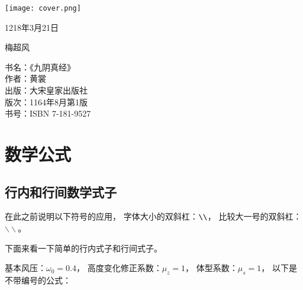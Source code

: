 \documentclass[b5paper,UTF8]{book}
\begin{document}

\thispagestyle{empty}

\begin{center}
\vspace*{3 cm}

\texttt{[image: cover.png]}
\vspace*{1 cm}

\vspace*{1 cm}

\Large {1218年3月21日}
\vspace*{0.5cm}

梅超风
\end{center}
\vspace*{4cm}

\clearpage

\newpage
\thispagestyle{empty}

\noindent
书名：《九阴真经》\\
作者：黄裳\\
出版：大宋皇家出版社\\
版次：1164年8月第1版\\
书号：ISBN 7-181-9527

\clearpage

\setcounter{page}{1}
\tableofcontents

\clearpage

\setcounter{page}{1}


\chapter{数学公式}

\section{行内和行间数学式子}

在此之前说明以下符号的应用，
字体大小的双斜杠：$ \verb|\\|$，
比较大一号的双斜杠：$\backslash\backslash$。

下面来看一下简单的行内式子和行间式子。

基本风压：$\omega_0 = 0.4$，
高度变化修正系数：$\mu_z = 1$，
体型系数：$\mu_s = 1$，
以下是不带编号的公式：
\end{document}
